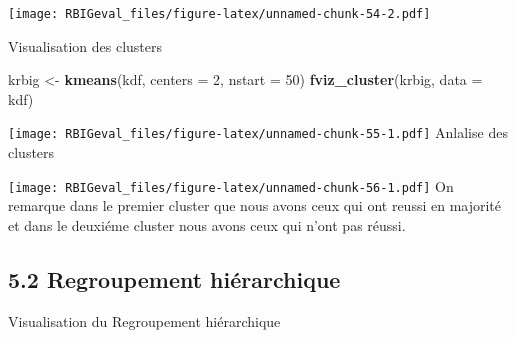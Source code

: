 \documentclass[
]{article}
\newenvironment{Shaded}{\begin{snugshade}}{\end{snugshade}}
\newcommand{\DataTypeTok}[1]{\textcolor[rgb]{0.13,0.29,0.53}{#1}}
\newcommand{\DecValTok}[1]{\textcolor[rgb]{0.00,0.00,0.81}{#1}}
\newcommand{\KeywordTok}[1]{\textcolor[rgb]{0.13,0.29,0.53}{\textbf{#1}}}
\newcommand{\NormalTok}[1]{#1}
\newcommand{\OperatorTok}[1]{\textcolor[rgb]{0.81,0.36,0.00}{\textbf{#1}}}
\newcommand{\StringTok}[1]{\textcolor[rgb]{0.31,0.60,0.02}{#1}}
\begin{document}
\texttt{[image: RBIGeval\_files/figure-latex/unnamed-chunk-54-2.pdf]}

Visualisation des clusters

\begin{Shaded}
\begin{Highlighting}[]
\NormalTok{krbig <-}\StringTok{ }\KeywordTok{kmeans}\NormalTok{(kdf, }\DataTypeTok{centers =} \DecValTok{2}\NormalTok{, }\DataTypeTok{nstart =} \DecValTok{50}\NormalTok{)}
\KeywordTok{fviz_cluster}\NormalTok{(krbig, }\DataTypeTok{data =}\NormalTok{ kdf)}
\end{Highlighting}
\end{Shaded}

\texttt{[image: RBIGeval\_files/figure-latex/unnamed-chunk-55-1.pdf]}
Anlalise des clusters

\begin{Shaded}
\end{Shaded}

\texttt{[image: RBIGeval\_files/figure-latex/unnamed-chunk-56-1.pdf]} On
remarque dans le premier cluster que nous avons ceux qui ont reussi en
majorité et dans le deuxiéme cluster nous avons ceux qui n'ont pas
réussi.

\hypertarget{regroupement-hiuxe9rarchique}{%
\subsection{5.2 Regroupement
hiérarchique}\label{regroupement-hiuxe9rarchique}}

Visualisation du Regroupement hiérarchique
\end{document}
